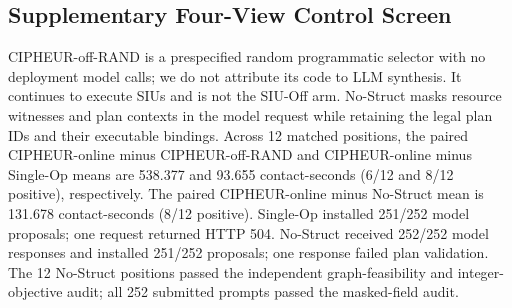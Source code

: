 \subsection{Supplementary Four-View Control Screen}
CIPHEUR-off-RAND is a prespecified random programmatic selector
with no deployment model calls; we do not attribute its code to LLM
synthesis. It continues to execute SIUs and is not the SIU-Off arm.
No-Struct masks resource witnesses and plan contexts in the model request
while retaining the legal plan IDs and their executable bindings.
Across 12 matched positions, the paired CIPHEUR-online minus
CIPHEUR-off-RAND and CIPHEUR-online minus Single-Op
means are 538.377 and 93.655 contact-seconds
(6/12 and 8/12 positive), respectively. The paired CIPHEUR-online
minus No-Struct mean is 131.678 contact-seconds (8/12 positive). Single-Op installed
251/252 model proposals; one request returned HTTP 504. No-Struct received
252/252 model responses and installed 251/252 proposals; one response
failed plan validation. The 12 No-Struct positions passed the independent
graph-feasibility and integer-objective audit; all 252 submitted prompts
passed the masked-field audit.
